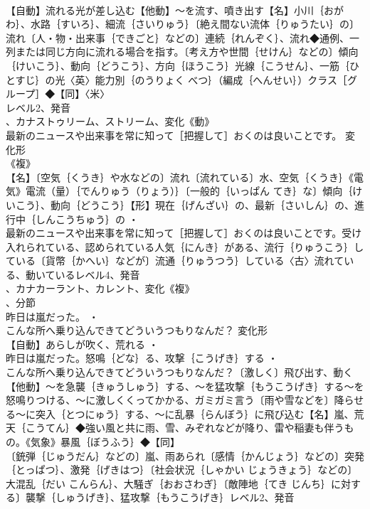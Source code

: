 \documentclass[8pt]{extreport}
\begin{document}
\begin{CJK}{UTF8}{min}
\\	【自動】流れる光が差し込む【他動】～を流す、噴き出す【名】小川｛おがわ｝、水路｛すいろ｝、細流｛さいりゅう｝〔絶え間ない流体｛りゅうたい｝の〕流れ〔人・物・出来事｛できごと｝などの〕連続｛れんぞく｝、流れ◆通例、一列または同じ方向に流れる場合を指す。〔考え方や世間｛せけん｝などの〕傾向｛けいこう｝、動向｛どうこう｝、方向｛ほうこう｝光線｛こうせん｝、一筋｛ひとすじ｝の光〈英〉能力別｛のうりょく べつ｝（編成｛へんせい｝）クラス［グループ］◆【同】〈米〉
\\	レベル2、発音
\\	、カナストゥリーム、ストリーム、変化《動》
\\	最新のニュースや出来事を常に知って［把握して］おくのは良いことです。	変化形 
\\	《複》
\\	【名】〔空気｛くうき｝や水などの〕流れ〔流れている〕水、空気｛くうき｝《電気》電流（量）｛でんりゅう（りょう）｝〔一般的｛いっぱん てき｝な〕傾向｛けいこう｝、動向｛どうこう｝【形】現在｛げんざい｝の、最新｛さいしん｝の、進行中｛しんこうちゅう｝の ・
\\	最新のニュースや出来事を常に知って［把握して］おくのは良いことです。受け入れられている、認められている人気｛にんき｝がある、流行｛りゅうこう｝している〔貨幣｛かへい｝などが〕流通｛りゅうつう｝している〈古〉流れている、動いているレベル4、発音
\\	、カナカーラント、カレント、変化《複》
\\	、分節
\\	昨日は嵐だった。 ・
\\	こんな所へ乗り込んできてどういうつもりなんだ？	変化形 
\\	【自動】あらしが吹く、荒れる ・
\\	昨日は嵐だった。怒鳴｛どな｝る、攻撃｛こうげき｝する ・
\\	こんな所へ乗り込んできてどういうつもりなんだ？〔激しく〕飛び出す、動く【他動】～を急襲｛きゅうしゅう｝する、～を猛攻撃｛もうこうげき｝する～を怒鳴りつける、～に激しくくってかかる、ガミガミ言う〔雨や雪などを〕降らせる～に突入｛とつにゅう｝する、～に乱暴｛らんぼう｝に飛び込む【名】嵐、荒天｛こうてん｝◆強い風と共に雨、雪、みぞれなどが降り、雷や稲妻も伴うもの。《気象》暴風｛ぼうふう｝◆【同】
\\	〔銃弾｛じゅうだん｝などの〕嵐、雨あられ〔感情｛かんじょう｝などの〕突発｛とっぱつ｝、激発｛げきはつ｝〔社会状況｛しゃかい じょうきょう｝などの〕大混乱｛だい こんらん｝、大騒ぎ｛おおさわぎ｝〔敵陣地｛てき じんち｝に対する〕襲撃｛しゅうげき｝、猛攻撃｛もうこうげき｝レベル2、発音

\end{CJK}
\end{document}
